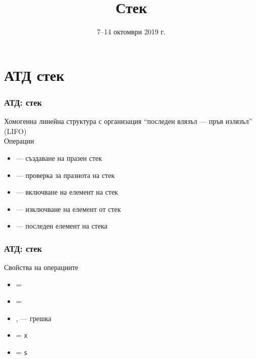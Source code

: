 \documentclass[alsotrans]{beamerswitch}
\title{Стек}
\date{7--14 октомври 2019 г.}
\begin{document}
\begin{frame}
  \titlepage
\end{frame}

\section{АТД стек}

\begin{frame}
  \frametitle{АТД: стек}

  Хомогенна линейна структура с организация ``последен влязъл --- пръв излязъл'' (LIFO)\\[1em]
  Операции\\[0.5em]
  \begin{itemize}
  \item {} --- създаване на празен стек
  \item {} --- проверка за празнота на стек
  \item {} --- включване на елемент на стек
  \item {} --- изключване на елемент от стек
  \item {} --- последен елемент на стека
  \end{itemize}
\end{frame}

\begin{frame}
  \frametitle{АТД: стек}

  Свойства на операциите\\[0.5em]
  \begin{itemize}
  \item {} = 
  \item {} = 
  \item {},  --- \alert{грешка}
  \item {} = \tt x
  \item {} = \tt s
  \end{itemize}
\end{frame}
\end{document}
